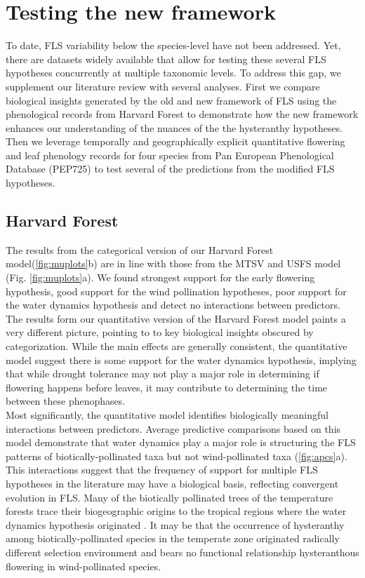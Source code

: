 \documentclass{article}
\begin{document}
\section*{Testing the new framework}
To date, FLS variability below the species-level have not been addressed. Yet, there are datasets widely available that allow for testing these several FLS hypotheses concurrently at multiple taxonomic levels. To address this gap, we supplement our literature review with several analyses. First we compare biological insights generated by the old and new framework of FLS using the phenological records from Harvard Forest to demonstrate how the new framework enhances our understanding of the nuances of the the hysteranthy hypotheses. Then we leverage temporally and geographically explicit quantitative flowering and leaf phenology records for four species from Pan European Phenological Database (PEP725) \citep{PEP725} to test several of the predictions from the modified FLS hypotheses.\\

\subsection*{Harvard Forest}
The results from the categorical version of our Harvard Forest model(\ref{fig:muplots}b) are in line with those from the MTSV and USFS model (Fig. \ref{fig:muplots}a). We found strongest support for the early flowering hypothesis, good support for the wind pollination hypotheses, poor support for the water dynamics hypothesis and detect no interactions between predictors. The results form our quantitative version of the Harvard Forest model paints a very different picture, pointing to to key biological insights obscured by categorization. While the main effects are generally consistent, the quantitative model suggest there is some support for the water dynamics hypothesis, implying that while drought tolerance may not play a major role in determining if flowering happens before leaves, it may contribute to determining the time between these phenophases.\\%

Most significantly, the quantitative model identifies biologically meaningful interactions between predictors. Average predictive comparisons based on this model demonstrate that water dynamics play a major role is structuring the FLS patterns of biotically-pollinated taxa but not wind-pollinated taxa (\ref{fig:apcs}a). This interactions suggest that the frequency of support for multiple FLS hypotheses in the literature may have a biological basis, reflecting convergent evolution in FLS. Many of the biotically pollinated trees of the temperature forests trace their biogeographic origins to the tropical regions where the water dynamics hypothesis originated \citep{Daubenmire1972}. It may be that the occurrence of hysteranthy among biotically-pollinated species in the temperate zone originated radically different selection environment and bears no functional relationship hysteranthous flowering in wind-pollinated species.
\end{document}
